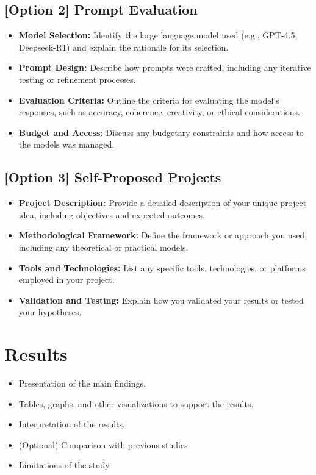\documentclass{article}
\begin{document}
\subsection{[Option 2] Prompt Evaluation}
\begin{itemize}
    \item \textbf{Model Selection:} Identify the large language model used (e.g., GPT-4.5, Deepseek-R1) and explain the rationale for its selection.
    \item \textbf{Prompt Design:} Describe how prompts were crafted, including any iterative testing or refinement processes.
    \item \textbf{Evaluation Criteria:} Outline the criteria for evaluating the model's responses, such as accuracy, coherence, creativity, or ethical considerations.
    \item \textbf{Budget and Access:} Discuss any budgetary constraints and how access to the models was managed.
\end{itemize}

\subsection{[Option 3] Self-Proposed Projects}
\begin{itemize}
    \item \textbf{Project Description:} Provide a detailed description of your unique project idea, including objectives and expected outcomes.
    \item \textbf{Methodological Framework:} Define the framework or approach you used, including any theoretical or practical models.
    \item \textbf{Tools and Technologies:} List any specific tools, technologies, or platforms employed in your project.
    \item \textbf{Validation and Testing:} Explain how you validated your results or tested your hypotheses.
\end{itemize}

\section{Results}
\begin{itemize}
    \item Presentation of the main findings.
    \item Tables, graphs, and other visualizations to support the results.
    \item Interpretation of the results.
    \item (Optional) Comparison with previous studies. 
    \item Limitations of the study.
\end{itemize}
\end{document}
